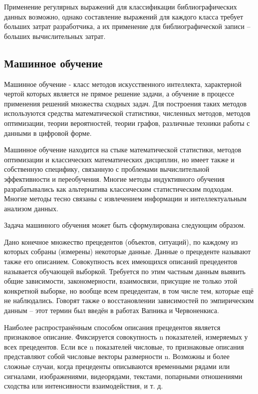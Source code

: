 Применение регулярных выражений для классификации библиографических данных возможно, однако составление выражений для каждого класса требует больших затрат разработчика, а их применение для библиографической записи -- больших вычислительных затрат.

\subsection{Машинное обучение}

Машинное обучение - класс методов искусственного интеллекта, характерной чертой которых является не прямое решение задачи, а обучение в процессе применения решений множества сходных задач. Для построения таких методов используются средства математической статистики, численных методов, методов оптимизации, теории вероятностей, теории графов, различные техники работы с данными в цифровой форме.

Машинное обучение находится на стыке математической статистики, методов оптимизации и классических математических дисциплин, но имеет также и собственную специфику, связанную с проблемами вычислительной эффективности и переобучения. Многие методы индуктивного обучения разрабатывались как альтернатива классическим статистическим подходам. Многие методы тесно связаны с извлечением информации и интеллектуальным анализом данных.

Задача машинного обучения может быть сформулирована следующим образом.

Дано конечное множество прецедентов (объектов, ситуаций), по каждому из которых собраны (измерены) некоторые данные. Данные о прецеденте называют также его описанием. Совокупность всех имеющихся описаний прецедентов называется обучающей выборкой. Требуется по этим частным данным выявить общие зависимости, закономерности, взаимосвязи, присущие не только этой конкретной выборке, но вообще всем прецедентам, в том числе тем, которые ещё не наблюдались. Говорят также о восстановлении зависимостей по эмпирическим данным -- этот термин был введён в работах Вапника и Червоненкиса.

Наиболее распространённым способом описания прецедентов является признаковое описание. Фиксируется совокупность n показателей, измеряемых у всех прецедентов. Если все n показателей числовые, то признаковые описания представляют собой числовые векторы размерности n. Возможны и более сложные случаи, когда прецеденты описываются временными рядами или сигналами, изображениями, видеорядами, текстами, попарными отношениями сходства или интенсивности взаимодействия, и т. д.

